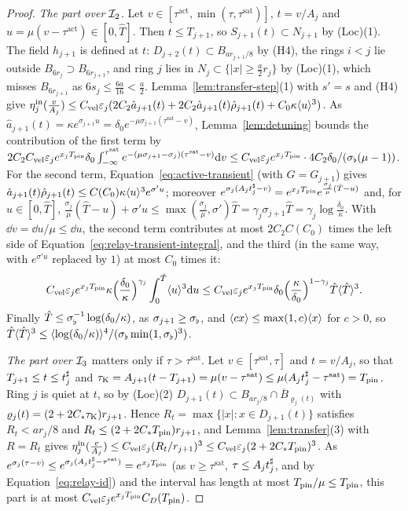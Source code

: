\begin{proof}
\emph{The part over $\mathcal{I}_2$.} Let $v\in[\tau^{\mathrm{act}},\min(\tau,\tau^{\mathrm{sat}})]$,
$t=v/A_j$ and $u=\mu(v-\tau^{\mathrm{act}})\in[0,\hat T]$. Then $t\le T_{j+1}$, so
$S_{j+1}(t)\subset N_{j+1}$ by (Loc)(1). The field $h_{j+1}$ is defined at $t$:
$D_{j+2}(t)\subset B_{ar_{j+1}/8}$ by (H4), the rings $i<j$ lie outside
$B_{6r_j}\supset B_{6r_{j+1}}$, and ring $j$ lies in $N_j\subset\{|x|\ge\frac a2r_j\}$
by (Loc)(1), which misses $B_{6r_{j+1}}$ as $6s_j\le\frac{6a}{16}<\frac a2$.
Lemma~\ref{lem:transfer-step}(1) with $s'=s$ and (H4) give
$\eta^{\mathrm{in}}_j(\frac{v}{A_j})\le C_{\mathrm{vel}} \varepsilon_j(2C_2\hat a_{j+1}(t)+2C_2\hat a_{j+1}(t)\hat\rho_{j+1}(t)+C_0\kappa\langle u\rangle^3)$.
As $\hat a_{j+1}(t)=\kappa e^{\sigma_{j+1}u}=\delta_0e^{-\mu\sigma_{j+1}(\tau^{\mathrm{sat}}-v)}$,
Lemma~\ref{lem:detuning} bounds the contribution of the first term by
$2C_2C_{\mathrm{vel}} \varepsilon_je^{x_jT_{\mathrm{pin}}}\delta_0\int_{-\infty}^{\tau^{\mathrm{sat}}}e^{-(\mu\sigma_{j+1}-\sigma_j)(\tau^{\mathrm{sat}}-v)}\dd v
\le C_{\mathrm{vel}} \varepsilon_je^{x_jT_{\mathrm{pin}}}\cdot4C_2\delta_0/(\sigma_\flat(\mu-1))$.
For the second term, Equation~\eqref{eq:active-transient} (with
$G=G_{j+1}$) gives $\hat a_{j+1}(t)\hat\rho_{j+1}(t)\le C(C_0)\kappa\langle u\rangle^3e^{\sigma'u}$;
moreover $e^{\sigma_j(A_jt^\sharp_j-v)}=e^{x_jT_{\mathrm{pin}}}e^{\frac{\sigma_j}\mu(\hat T-u)}$ and,
for $u\in[0,\hat T]$,
$\frac{\sigma_j}\mu(\hat T-u)+\sigma'u\le\max(\frac{\sigma_j}\mu,\sigma')\hat T=\gamma_j\sigma_{j+1}\hat T=\gamma_j\log\frac{\delta_0}\kappa$.
With $\dd v=\dd u/\mu\le\dd u$, the second term contributes at most $2C_2C(C_0)$
times the left side of Equation~\eqref{eq:relay-transient-integral}, and the third (in the same way,
with $e^{\sigma'u}$ replaced by $1$) at most $C_0$ times it:
\begin{equation}
\label{eq:relay-transient-integral}
C_{\mathrm{vel}} \varepsilon_je^{x_jT_{\mathrm{pin}}}\kappa\Big(\frac{\delta_0}\kappa\Big)^{\gamma_j}\int_0^{\hat T}\langle u\rangle^3\dd u
\le C_{\mathrm{vel}} \varepsilon_je^{x_jT_{\mathrm{pin}}}\delta_0\Big(\frac\kappa{\delta_0}\Big)^{1-\gamma_j}\hat T\langle \hat T\rangle^3 .
\end{equation}
Finally $\hat T\le\sigma_\flat^{-1}\log(\delta_0/\kappa)$, as $\sigma_{j+1}\ge\sigma_\flat$, and
$\langle cx\rangle\le\max(1,c)\langle x\rangle$ for $c>0$, so
$\hat T\langle \hat T\rangle^3\le\langle\log(\delta_0/\kappa)\rangle^4/(\sigma_\flat\min(1,\sigma_\flat)^3)$.

\emph{The part over $\mathcal{I}_3$} matters only if $\tau>\tau^{\mathrm{sat}}$. Let
$v\in[\tau^{\mathrm{sat}},\tau]$ and $t=v/A_j$, so that $T_{j+1}\le t\le t^\sharp_j$ and
$\tau_{\mathrm{K}}=A_{j+1}(t-T_{j+1})=\mu(v-\tau^{\mathrm{sat}})\le\mu(A_jt^\sharp_j-\tau^{\mathrm{sat}})=T_{\mathrm{pin}}$. Ring $j$ is quiet at
$t$, so by (Loc)(2) $D_{j+1}(t)\subset B_{ar_j/8}\cap\overline B_{\varrho_j(t)}$ with
$\varrho_j(t)=(2+2C_{*}\tau_{\mathrm{K}})r_{j+1}$. Hence $R_t=\max\{|x|:x\in D_{j+1}(t)\}$
satisfies $R_t<ar_j/8$ and $R_t\le(2+2C_{*}T_{\mathrm{pin}})r_{j+1}$, and
Lemma~\ref{lem:transfer}(3) with $R=R_t$ gives
$\eta^{\mathrm{in}}_j(\frac{v}{A_j})\le C_{\mathrm{vel}} \varepsilon_j(R_t/r_{j+1})^3\le C_{\mathrm{vel}} \varepsilon_j(2+2C_{*}T_{\mathrm{pin}})^3$. As
$e^{\sigma_j(\tau-v)}\le e^{\sigma_j(A_jt^\sharp_j-\tau^{\mathrm{sat}})}=e^{x_jT_{\mathrm{pin}}}$ (as
$v\ge\tau^{\mathrm{sat}}$, $\tau\le A_jt^\sharp_j$, and by Equation~\eqref{eq:relay-id}) and the
interval has length at most $T_{\mathrm{pin}}/\mu\le T_{\mathrm{pin}}$, this part is at most
$C_{\mathrm{vel}} \varepsilon_je^{x_jT_{\mathrm{pin}}}C_D(T_{\mathrm{pin}})$.


\end{proof}
